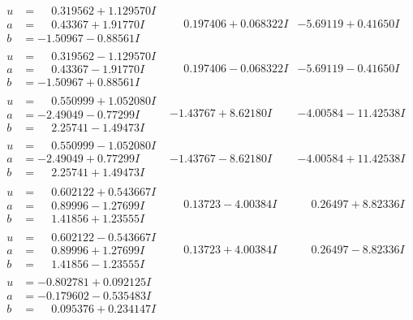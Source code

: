 \documentclass[1p]{elsarticle_modified}
\theoremstyle{definition}
\begin{document}
$$\begin{array}{c|c|c}
\begin{aligned}
u &= \phantom{-}0.319562 + 1.129570 I \\
a &= \phantom{-}0.43367 + 1.91770 I \\
b &= -1.50967 - 0.88561 I\end{aligned}
 & \phantom{-}0.197406 + 0.068322 I & -5.69119 + 0.41650 I \\ \hline\begin{aligned}
u &= \phantom{-}0.319562 - 1.129570 I \\
a &= \phantom{-}0.43367 - 1.91770 I \\
b &= -1.50967 + 0.88561 I\end{aligned}
 & \phantom{-}0.197406 - 0.068322 I & -5.69119 - 0.41650 I \\ \hline\begin{aligned}
u &= \phantom{-}0.550999 + 1.052080 I \\
a &= -2.49049 - 0.77299 I \\
b &= \phantom{-}2.25741 - 1.49473 I\end{aligned}
 & -1.43767 + 8.62180 I & -4.00584 - 11.42538 I \\ \hline\begin{aligned}
u &= \phantom{-}0.550999 - 1.052080 I \\
a &= -2.49049 + 0.77299 I \\
b &= \phantom{-}2.25741 + 1.49473 I\end{aligned}
 & -1.43767 - 8.62180 I & -4.00584 + 11.42538 I \\ \hline\begin{aligned}
u &= \phantom{-}0.602122 + 0.543667 I \\
a &= \phantom{-}0.89996 - 1.27699 I \\
b &= \phantom{-}1.41856 + 1.23555 I\end{aligned}
 & \phantom{-}0.13723 - 4.00384 I & \phantom{-}0.26497 + 8.82336 I \\ \hline\begin{aligned}
u &= \phantom{-}0.602122 - 0.543667 I \\
a &= \phantom{-}0.89996 + 1.27699 I \\
b &= \phantom{-}1.41856 - 1.23555 I\end{aligned}
 & \phantom{-}0.13723 + 4.00384 I & \phantom{-}0.26497 - 8.82336 I \\ \hline\begin{aligned}
u &= -0.802781 + 0.092125 I \\
a &= -0.179602 - 0.535483 I \\
b &= \phantom{-}0.095376 + 0.234147 I\end{aligned}

\end{array}$$
\end{document}

